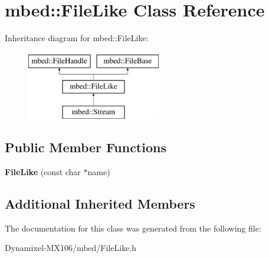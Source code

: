 \hypertarget{classmbed_1_1_file_like}{}\section{mbed\+:\+:File\+Like Class Reference}
\label{classmbed_1_1_file_like}
Inheritance diagram for mbed\+:\+:File\+Like\+:\begin{figure}[H]
\begin{center}
\leavevmode
\includegraphics[height=3.000000cm]{classmbed_1_1_file_like}
\end{center}
\end{figure}
\subsection*{Public Member Functions}
\begin{DoxyCompactItemize}
\item 
{\bfseries File\+Like} (const char $\ast$name)\hypertarget{classmbed_1_1_file_like_a45088db3d27b7f4461bf3017dfa959b5}{}\label{classmbed_1_1_file_like_a45088db3d27b7f4461bf3017dfa959b5}

\end{DoxyCompactItemize}
\subsection*{Additional Inherited Members}


The documentation for this class was generated from the following file\+:\begin{DoxyCompactItemize}
\item 
Dynamixel-\/\+M\+X106/mbed/File\+Like.\+h\end{DoxyCompactItemize}
